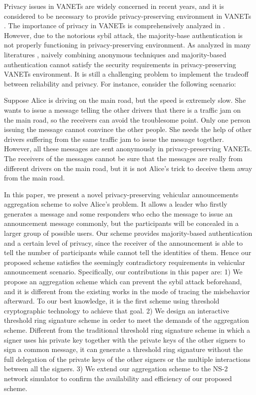 \documentclass[a4paper]{article}
\begin{document}
Privacy issues in VANETs are widely concerned in recent years, and it is considered to be necessary to provide privacy-preserving environment in VANETs \cite{HL08}\cite{PP05}. The importance of privacy in VANETs is comprehensively analyzed in \cite{Dot06}. However, due to the notorious sybil attack\cite{Dou02}, the majority-base authentication is not properly functioning in privacy-preserving environment. As analyzed in many literatures \cite{CNW11}\cite{KWL09}\cite{Lin13}, naively combining anonymous techniques and majority-based authentication cannot satisfy the security requirements in privacy-preserving VANETs environment. It is still a challenging problem to implement the tradeoff between reliability and privacy. For instance, consider the following scenario:

Suppose Alice is driving on the main road, but the speed is extremely slow. She wants to issue a message telling the other drivers that there is a traffic jam on the main road, so the receivers can avoid the troublesome point. Only one person issuing the message cannot convince the other people. She needs the help of other drivers suffering from the same traffic jam to issue the message together. However, all these messages are sent anonymously in privacy-preserving VANETs. The receivers of the messages cannot be sure that the messages are really from different drivers on the main road, but it is not Alice's trick to deceive them away from the main road.

In this paper, we present a novel privacy-preserving vehicular announcements aggregation scheme to solve Alice's problem. It allows a leader who firstly generates a message and some responders who echo the message to issue an announcement message commonly, but the participants will be concealed in a larger group of possible users. Our scheme provides majority-based authentication and a certain level of privacy, since the receiver of the announcement is able to tell the number of participants while cannot tell the identities of them. Hence our proposed scheme satisfies the seemingly contradictory requirements in vehicular announcement scenario. Specifically, our contributions in this paper are: 1) We propose an aggregation scheme which can prevent the sybil attack beforehand, and it is different from the existing works in the mode of tracing the misbehavior afterward. To our best knowledge, it is the first scheme using threshold cryptographic technology to achieve that goal. 2) We design an interactive threshold ring signature scheme in order to meet the demands of the aggregation scheme. Different from the traditional threshold ring signature scheme in which a signer uses his private key together with the private keys of the other signers to sign a common message, it can generate a threshold ring signature without the full delegation of the private keys of the other signers or the multiple interactions between all the signers. 3) We extend our aggregation scheme to the NS-2 network simulator to confirm the availability and efficiency of our proposed scheme.
\end{document}
